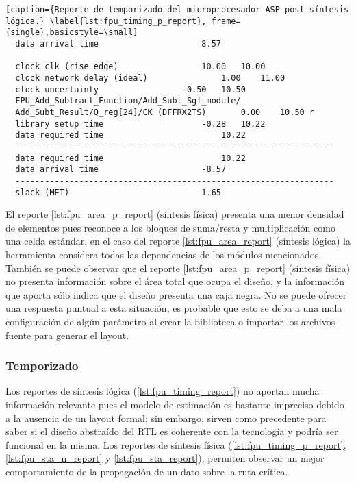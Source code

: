 \begin{lstlisting}[caption={Reporte de temporizado del microprocesador ASP post síntesis lógica.} \label{lst:fpu_timing_p_report}, frame={single},basicstyle=\small]
  data arrival time						8.57

  clock clk (rise edge)					10.00	10.00
  clock network delay (ideal)				1.00	11.00
  clock uncertainty					-0.50	10.50
  FPU_Add_Subtract_Function/Add_Subt_Sgf_module/
  Add_Subt_Result/Q_reg[24]/CK (DFFRX2TS)		0.00	10.50 r
  library setup time					-0.28	10.22
  data required time						10.22
  -----------------------------------------------------------------
  data required time						10.22
  data arrival time						-8.57
  -----------------------------------------------------------------
  slack (MET)							1.65
\end{lstlisting}

El reporte \ref{lst:fpu_area_p_report} (síntesis física) presenta una menor densidad de elementos pues reconoce a los bloques de suma/resta y multiplicación como una celda estándar, en el caso del reporte \ref{lst:fpu_area_report} (síntesis lógica) la herramienta considera todas las dependencias de los módulos mencionados. También se puede observar que el reporte \ref{lst:fpu_area_p_report} (síntesis física) no presenta información sobre el área total que ocupa el diseño, y la información que aporta sólo indica que el diseño presenta una caja negra. No se puede ofrecer una respuesta puntual a esta situación, es probable que esto se deba a una mala configuración de algún parámetro al crear la biblioteca o importar los archivos fuente para generar el layout.

\subsubsection{Temporizado}

Los reportes de síntesis lógica (\ref{lst:fpu_timing_report}) no aportan mucha información relevante pues el modelo de estimación es bastante impreciso debido a la ausencia de un layout formal; sin embargo, sirven como precedente para saber si el diseño abstraído del RTL es coherente con la tecnología y podría ser funcional en la misma. Los reportes de síntesis física (\ref{lst:fpu_timing_p_report}, \ref{lst:fpu_sta_n_report} y \ref{lst:fpu_sta_report}), permiten observar un mejor comportamiento de la propagación de un dato sobre la ruta crítica.


